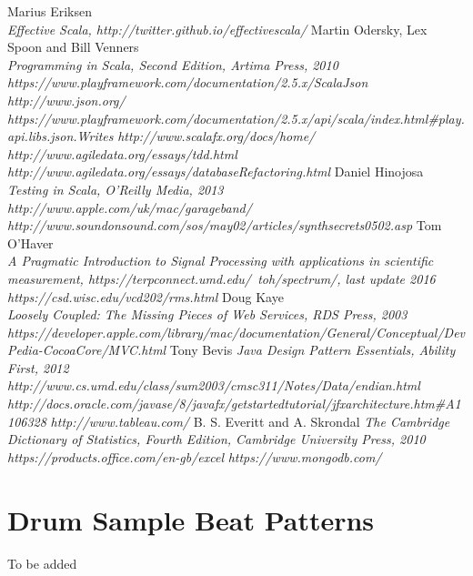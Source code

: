 \documentclass[a4paper, 11pt]{article}
\begin{document}
\begin{thebibliography}{99}
Marius Eriksen\\
\textit{Effective Scala, http://twitter.github.io/effectivescala/}
Martin Odersky, Lex Spoon and Bill Venners\\
\textit{Programming in Scala, Second Edition, Artima Press, 2010}
\textit{https://www.playframework.com/documentation/2.5.x/ScalaJson}
\textit{http://www.json.org/}
\textit{https://www.playframework.com/documentation/2.5.x/api/scala/index.html\#play.api.libs.json.Writes}
\textit{http://www.scalafx.org/docs/home/}
\textit{http://www.agiledata.org/essays/tdd.html}
\textit{http://www.agiledata.org/essays/databaseRefactoring.html}
Daniel Hinojosa\\
\textit{Testing in Scala, O’Reilly Media, 2013}
\textit{http://www.apple.com/uk/mac/garageband/}
\textit{http://www.soundonsound.com/sos/may02/articles/synthsecrets0502.asp}
Tom O'Haver\\
\textit{A Pragmatic Introduction to Signal Processing with applications in scientific measurement, https://terpconnect.umd.edu/~toh/spectrum/, last update 2016}
\textit{https://csd.wisc.edu/vcd202/rms.html}
Doug Kaye\\
\textit{Loosely Coupled: The Missing Pieces of Web Services, RDS Press, 2003}
\textit{https://developer.apple.com/library/mac/documentation/General/Conceptual/DevPedia-CocoaCore/MVC.html}
Tony Bevis
\textit{Java Design Pattern Essentials, Ability First, 2012}
\textit{http://www.cs.umd.edu/class/sum2003/cmsc311/Notes/Data/endian.html}
\textit{http://docs.oracle.com/javase/8/javafx/get\-started\-tutorial/jfx\-architecture.htm\#A1106328}
\textit{http://www.tableau.com/}
B. S. Everitt and A. Skrondal
\textit{The Cambridge Dictionary of Statistics, Fourth Edition, Cambridge University Press, 2010}
\textit{https://products.office.com/en-gb/excel}
\textit{https://www.mongodb.com/}
\end{thebibliography}

\newpage

\appendix
\section{Drum Sample Beat Patterns}
To be added
\end{document}
